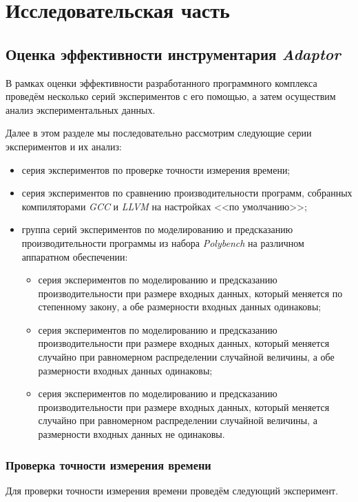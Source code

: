 \chapter{Исследовательская часть}
\section{Оценка эффективности инструментария \textit{Adaptor}}
\label{sec:evaluation}

В рамках оценки эффективности разработанного программного комплекса проведём несколько серий экспериментов с его помощью, а затем осуществим анализ экспериментальных данных.

Далее в этом разделе мы последовательно рассмотрим следующие серии экспериментов и их анализ:
\begin{itemize}
    \item серия экспериментов по проверке точности измерения времени;
    \item серия экспериментов по сравнению производительности программ, собранных компиляторами \textit{GCC} и \textit{LLVM} на настройках <<по умолчанию>>;
    \item группа серий экспериментов по моделированию и предсказанию производительности программы из набора \textit{Polybench} на различном аппаратном обеспечении:
    \begin{itemize}
        \item серия экспериментов по моделированию и предсказанию производительности при размере входных данных, который меняется по степенному закону, а обе размерности входных данных одинаковы;
        \item серия экспериментов по моделированию и предсказанию производительности при размере входных данных, который меняется случайно при равномерном распределении случайной величины, а обе размерности входных данных одинаковы;
        \item серия экспериментов по моделированию и предсказанию производительности при размере входных данных, который меняется случайно при равномерном распределении случайной величины, а размерности входных данных не одинаковы.
    \end{itemize}
\end{itemize}

\subsection{Проверка точности измерения времени}
\label{ssec:series-accuracy}
Для проверки точности измерения времени проведём следующий эксперимент.

